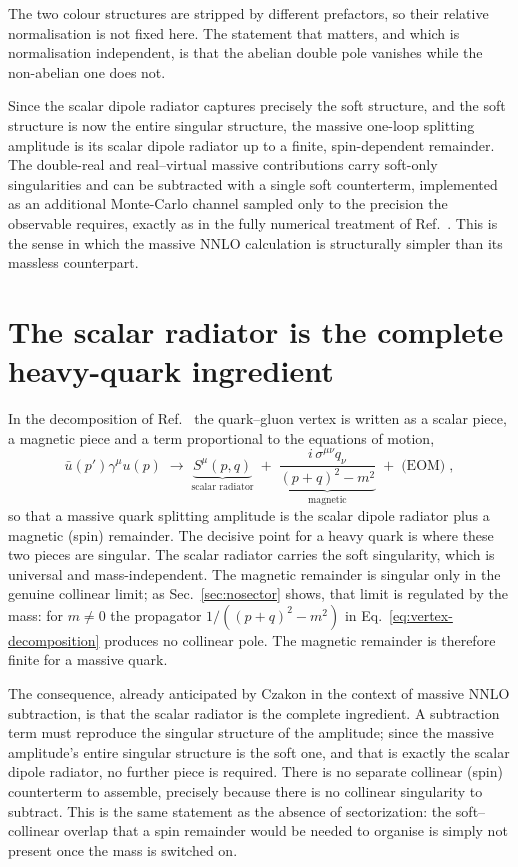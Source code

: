 \documentclass[11pt,a4paper]{article}
\begin{document}
\noindent
The two colour structures are stripped by different prefactors, so their relative
normalisation is not fixed here. The statement that matters, and which is
normalisation independent, is that the abelian double pole  {vanishes} while
the non-abelian one does not.

Since the scalar dipole radiator captures precisely the soft structure, and the
soft structure is now the  {entire} singular structure, the massive one-loop
splitting amplitude  {is} its scalar dipole radiator up to a finite,
spin-dependent remainder. The double-real and real--virtual massive contributions
carry soft-only singularities and can be subtracted with a single soft
counterterm, implemented as an additional Monte-Carlo channel sampled only to the
precision the observable requires, exactly as in the fully numerical treatment of
Ref.~\cite{Czakon:stripper}. This is the sense in which the massive NNLO
calculation is structurally simpler than its massless counterpart.

\section{The scalar radiator is the complete heavy-quark ingredient}
\label{sec:splitting}
In the decomposition of Ref.~\cite{Campbell:2025} the quark--gluon vertex is
written as a scalar piece, a magnetic piece and a term proportional to the
equations of motion,
\begin{equation}
  \bar u(p')\gamma^\mu u(p)\;\longrightarrow\;
  \underbrace{S^\mu(p,q)}_{\text{scalar radiator}}
  \;+\;\underbrace{\frac{i\,\sigma^{\mu\nu}q_\nu}{(p+q)^2-m^2}}_{\text{magnetic}}
  \;+\;\text{(EOM)}\;,
  \label{eq:vertex-decomposition}
\end{equation}
so that a massive quark splitting amplitude is the scalar dipole radiator plus a
magnetic (spin) remainder. The decisive point for a heavy quark is where these two
pieces are singular. The scalar radiator carries the soft singularity,
which is universal and mass-independent. The magnetic remainder is singular only in
the genuine collinear limit; as Sec.~\ref{sec:nosector} shows, that
limit is regulated by the mass: for $m\neq0$ the propagator $1/((p+q)^2-m^2)$ in
Eq.~\eqref{eq:vertex-decomposition} produces no collinear pole. The magnetic
remainder is therefore finite for a massive quark.

The consequence, already anticipated by Czakon in the context of massive NNLO
subtraction, is that the scalar radiator is the complete ingredient. A
subtraction term must reproduce the singular structure of the amplitude; since the
massive amplitude's entire singular structure is the soft one, and that is exactly
the scalar dipole radiator, no further piece is required. There is no separate
collinear (spin) counterterm to assemble, precisely because there is no collinear
singularity to subtract. This is the same statement as the absence of
sectorization: the soft--collinear overlap that a spin remainder would be needed to
organise is simply not present once the mass is switched on.
\end{document}
